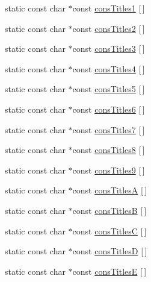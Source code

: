 \begin{DoxyCompactItemize}
\item 
static const char $\ast$const \hyperlink{class_report_desc_parser_base_a4997a30230193326b84fb8f3d3d30536}{cons\-Titles1} \mbox{[}$\,$\mbox{]}
\item 
static const char $\ast$const \hyperlink{class_report_desc_parser_base_a7b760abbe1a67f241a9c6d34da9207f4}{cons\-Titles2} \mbox{[}$\,$\mbox{]}
\item 
static const char $\ast$const \hyperlink{class_report_desc_parser_base_ae481ca9afe5a7d500664b6802c985d8b}{cons\-Titles3} \mbox{[}$\,$\mbox{]}
\item 
static const char $\ast$const \hyperlink{class_report_desc_parser_base_ace9cf011244ddade875cb8f2921c3d58}{cons\-Titles4} \mbox{[}$\,$\mbox{]}
\item 
static const char $\ast$const \hyperlink{class_report_desc_parser_base_a0f96db464d287695f7611f38ca9b0058}{cons\-Titles5} \mbox{[}$\,$\mbox{]}
\item 
static const char $\ast$const \hyperlink{class_report_desc_parser_base_af4da29c34852a2589de1c64a0bf8e4b3}{cons\-Titles6} \mbox{[}$\,$\mbox{]}
\item 
static const char $\ast$const \hyperlink{class_report_desc_parser_base_ac1cf3d87296aa74a35627079a5cd1753}{cons\-Titles7} \mbox{[}$\,$\mbox{]}
\item 
static const char $\ast$const \hyperlink{class_report_desc_parser_base_a3b4a0c98b10afe968027e78281efc752}{cons\-Titles8} \mbox{[}$\,$\mbox{]}
\item 
static const char $\ast$const \hyperlink{class_report_desc_parser_base_ac47d6ae6c995224d151aed3403f2e38f}{cons\-Titles9} \mbox{[}$\,$\mbox{]}
\item 
static const char $\ast$const \hyperlink{class_report_desc_parser_base_a27f2a10cbf94bc44a25d221d794ce3f3}{cons\-Titles\-A} \mbox{[}$\,$\mbox{]}
\item 
static const char $\ast$const \hyperlink{class_report_desc_parser_base_a0c406d39f05eaa4f708af495c5d20bbb}{cons\-Titles\-B} \mbox{[}$\,$\mbox{]}
\item 
static const char $\ast$const \hyperlink{class_report_desc_parser_base_a149498f082b56537f6958f35cdf72485}{cons\-Titles\-C} \mbox{[}$\,$\mbox{]}
\item 
static const char $\ast$const \hyperlink{class_report_desc_parser_base_a4db83eb7ee2c16ff29da2c09dbf182f3}{cons\-Titles\-D} \mbox{[}$\,$\mbox{]}
\item 
static const char $\ast$const \hyperlink{class_report_desc_parser_base_a46332dbba5ab524aedb370684510c990}{cons\-Titles\-E} \mbox{[}$\,$\mbox{]}

\end{DoxyCompactItemize}
